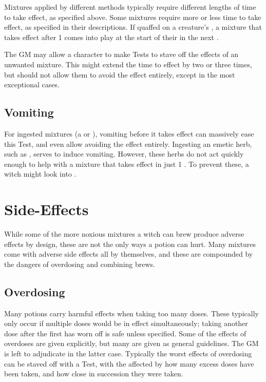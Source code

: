 Mixtures applied by different methods typically require different lengths of time to take effect, as specified above.
Some mixtures require more or less time to take effect, as specified in their descriptions.
If quaffed on a creature's {\turn}, a mixture that takes effect after 1 {\round} comes into play at the start of their {\turn} in the next {\round}.

The GM may allow a character to make  Tests to stave off the effects of an unwanted mixture.
This might extend the time to effect by two or three times, but should not allow them to avoid the effect entirely, except in the most exceptional cases.

\subsection{Vomiting}

For ingested mixtures (a  or ), vomiting before it takes effect can massively ease this  Test, and even allow avoiding the effect entirely.
Ingesting an emetic herb, such as , serves to induce vomiting.
However, these herbs do not act quickly enough to help with a mixture that takes effect in just 1 {\round}.
To prevent these, a witch might look into .

\section{Side-Effects}

While some of the more noxious mixtures a witch can brew produce adverse effects by design, these are not the only ways a potion can hurt.
Many mixtures come with adverse side effects all by themselves, and these are compounded by the dangers of overdosing and combining brews.

\subsection{Overdosing}

Many potions carry harmful effects when taking too many doses.
These typically only occur if multiple doses would be in effect simultaneously; taking another dose after the first has worn off is safe unless specified.
Some of the effects of overdoses are given explicitly, but many are given as general guidelines.
The GM is left to adjudicate in the latter case.
Typically the worst effects of overdosing can be staved off with a  Test, with the {\tn} affected by how many excess doses have been taken, and how close in succession they were taken.

